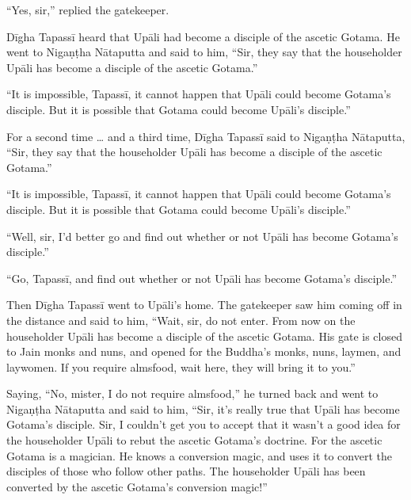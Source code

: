 \documentclass[12pt,openany]{book}%
\begin{document}
“Yes, sir,” replied the gatekeeper. 

\textsanskrit{Dīgha} \textsanskrit{Tapassī} heard that \textsanskrit{Upāli} had become a disciple of the ascetic Gotama. He went to \textsanskrit{Nigaṇṭha} \textsanskrit{Nātaputta} and said to him, “Sir, they say that the householder \textsanskrit{Upāli} has become a disciple of the ascetic Gotama.” 

“It is impossible, \textsanskrit{Tapassī}, it cannot happen that \textsanskrit{Upāli} could become Gotama’s disciple. But it is possible that Gotama could become \textsanskrit{Upāli}’s disciple.” 

For a second time … and a third time, \textsanskrit{Dīgha} \textsanskrit{Tapassī} said to \textsanskrit{Nigaṇṭha} \textsanskrit{Nātaputta}, “Sir, they say that the householder \textsanskrit{Upāli} has become a disciple of the ascetic Gotama.” 

“It is impossible, \textsanskrit{Tapassī}, it cannot happen that \textsanskrit{Upāli} could become Gotama’s disciple. But it is possible that Gotama could become \textsanskrit{Upāli}’s disciple.” 

“Well, sir, I’d better go and find out whether or not \textsanskrit{Upāli} has become Gotama’s disciple.” 

“Go, \textsanskrit{Tapassī}, and find out whether or not \textsanskrit{Upāli} has become Gotama’s disciple.” 

Then \textsanskrit{Dīgha} \textsanskrit{Tapassī} went to \textsanskrit{Upāli}’s home. The gatekeeper saw him coming off in the distance and said to him, “Wait, sir, do not enter. From now on the householder \textsanskrit{Upāli} has become a disciple of the ascetic Gotama. His gate is closed to Jain monks and nuns, and opened for the Buddha’s monks, nuns, laymen, and laywomen. If you require almsfood, wait here, they will bring it to you.” 

Saying, “No, mister, I do not require almsfood,” he turned back and went to \textsanskrit{Nigaṇṭha} \textsanskrit{Nātaputta} and said to him, “Sir, it’s really true that \textsanskrit{Upāli} has become Gotama’s disciple. Sir, I couldn’t get you to accept that it wasn’t a good idea for the householder \textsanskrit{Upāli} to rebut the ascetic Gotama’s doctrine. For the ascetic Gotama is a magician. He knows a conversion magic, and uses it to convert the disciples of those who follow other paths. The householder \textsanskrit{Upāli} has been converted by the ascetic Gotama’s conversion magic!” 
\end{document}
